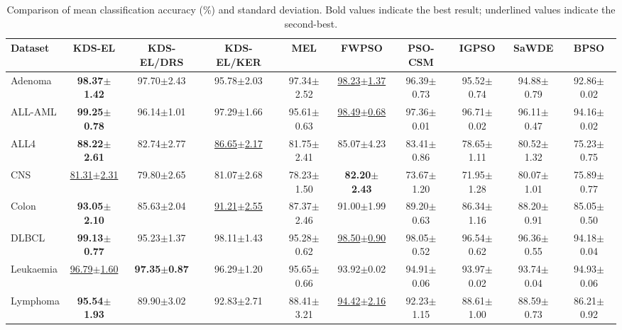 \begin{table}[t]
\centering
\caption{Comparison of mean classification accuracy (\%) and standard deviation.
Bold values indicate the best result; underlined values indicate the second-best.}
\label{tab:accuracy}
\setlength{\tabcolsep}{3.5pt}
\begin{tabular}{lccccccccc}
\toprule
\textbf{Dataset} & \textbf{KDS-EL} & \textbf{KDS-EL/DRS} & \textbf{KDS-EL/KER} & \textbf{MEL} & \textbf{FWPSO} & \textbf{PSO-CSM} & \textbf{IGPSO} & \textbf{SaWDE} & \textbf{BPSO} \\
\midrule
Adenoma & \textbf{98.37$\pm$1.42} & 97.70$\pm$2.43 & 95.78$\pm$2.03 & 97.34$\pm$2.52 & \underline{98.23$\pm$1.37} & 96.39$\pm$0.73 & 95.52$\pm$0.74 & 94.88$\pm$0.79 & 92.86$\pm$0.02 \\
ALL-AML & \textbf{99.25$\pm$0.78} & 96.14$\pm$1.01 & 97.29$\pm$1.66 & 95.61$\pm$0.63 & \underline{98.49$\pm$0.68} & 97.36$\pm$0.01 & 96.71$\pm$0.02 & 96.11$\pm$0.47 & 94.16$\pm$0.02 \\
ALL4 & \textbf{88.22$\pm$2.61} & 82.74$\pm$2.77 & \underline{86.65$\pm$2.17} & 81.75$\pm$2.41 & 85.07$\pm$4.23 & 83.41$\pm$0.86 & 78.65$\pm$1.11 & 80.52$\pm$1.32 & 75.23$\pm$0.75 \\
CNS & \underline{81.31$\pm$2.31} & 79.80$\pm$2.65 & 81.07$\pm$2.68 & 78.23$\pm$1.50 & \textbf{82.20$\pm$2.43} & 73.67$\pm$1.20 & 71.95$\pm$1.28 & 80.07$\pm$1.01 & 75.89$\pm$0.77 \\
Colon & \textbf{93.05$\pm$2.10} & 85.63$\pm$2.04 & \underline{91.21$\pm$2.55} & 87.37$\pm$2.46 & 91.00$\pm$1.99 & 89.20$\pm$0.63 & 86.34$\pm$1.16 & 88.20$\pm$0.91 & 85.05$\pm$0.50 \\
DLBCL & \textbf{99.13$\pm$0.77} & 95.23$\pm$1.37 & 98.11$\pm$1.43 & 95.28$\pm$0.62 & \underline{98.50$\pm$0.90} & 98.05$\pm$0.52 & 96.54$\pm$0.62 & 96.36$\pm$0.55 & 94.18$\pm$0.04 \\
Leukaemia & \underline{96.79$\pm$1.60} & \textbf{97.35$\pm$0.87} & 96.29$\pm$1.20 & 95.65$\pm$0.66 & 93.92$\pm$0.02 & 94.91$\pm$0.06 & 93.97$\pm$0.02 & 93.74$\pm$0.04 & 94.93$\pm$0.06 \\
Lymphoma & \textbf{95.54$\pm$1.93} & 89.90$\pm$3.02 & 92.83$\pm$2.71 & 88.41$\pm$3.21 & \underline{94.42$\pm$2.16} & 92.23$\pm$1.15 & 88.61$\pm$1.00 & 88.59$\pm$0.73 & 86.21$\pm$0.92 \\

\end{tabular}
\end{table}

